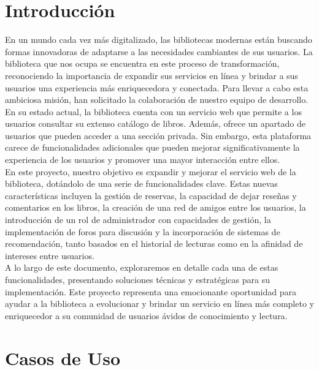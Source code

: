 \documentclass{report}
\begin{document}
    \chapter{Introducción}
    En un mundo cada vez más digitalizado, las bibliotecas modernas están buscando formas innovadoras de adaptarse a las necesidades cambiantes de sus usuarios. La biblioteca que nos ocupa se encuentra en este proceso de transformación, reconociendo la importancia de expandir sus servicios en línea y brindar a sus usuarios una experiencia más enriquecedora y conectada. Para llevar a cabo esta ambiciosa misión, han solicitado la colaboración de nuestro equipo de desarrollo.\\
    En su estado actual, la biblioteca cuenta con un servicio web que permite a los usuarios consultar su extenso catálogo de libros. Además, ofrece un apartado de usuarios que pueden acceder a una sección privada. Sin embargo, esta plataforma carece de funcionalidades adicionales que pueden mejorar significativamente la experiencia de los usuarios y promover una mayor interacción entre ellos.\\
    En este proyecto, nuestro objetivo es expandir y mejorar el servicio web de la biblioteca, dotándolo de una serie de funcionalidades clave. Estas nuevas características incluyen la gestión de reservas, la capacidad de dejar reseñas y comentarios en los libros, la creación de una red de amigos entre los usuarios, la introducción de un rol de administrador con capacidades de gestión, la implementación de foros para discusión y la incorporación de sistemas de recomendación, tanto basados en el historial de lecturas como en la afinidad de intereses entre usuarios.\\
    A lo largo de este documento, exploraremos en detalle cada una de estas funcionalidades, presentando soluciones técnicas y estratégicas para su implementación. Este proyecto representa una emocionante oportunidad para ayudar a la biblioteca a evolucionar y brindar un servicio en línea más completo y enriquecedor a su comunidad de usuarios ávidos de conocimiento y lectura.\\
    \chapter{Casos de Uso}
\end{document}
